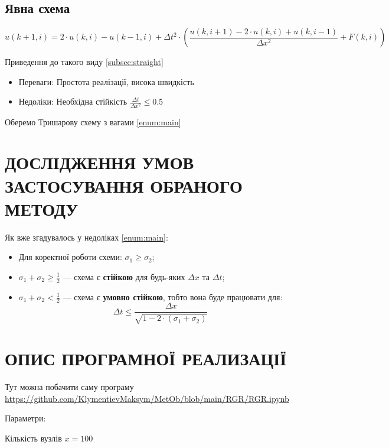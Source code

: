 \documentclass{article}
\begin{document}
        \subsection{Явна схема}
            \label{enum:straight}
            $$ u(k+1, i) = 2 \cdot u(k, i) - u(k-1, i) + \Delta{t}^2 \cdot \left( \frac{u(k, i+1) - 2 \cdot u(k, i) + u(k, i-1)}{\Delta{x}^2} + F(k, i) \right) $$

            Приведення до такого виду \eqref{subsec:straight}

            \begin{itemize}
                \item Переваги: Простота реалізації, висока швидкість
                \item Недоліки\label{itemz:straight}: Необхідна стійкість $ \frac{\Delta{t}}{\Delta{x}^2} \leq 0.5 $
            \end{itemize}

        Оберемо Тришарову схему з вагами \eqref{enum:main}

    \newpage
    \section{ДОСЛІДЖЕННЯ УМОВ ЗАСТОСУВАННЯ ОБРАНОГО МЕТОДУ}

    Як вже згадувалось у недоліках \eqref{enum:main}:

    \begin{itemize}
        \item Для коректної роботи схеми: $ \sigma_1 \geq \sigma_2 $;
        \item $ \sigma_1 + \sigma_2 \geq \frac{1}{2} $ --- схема є \textbf{стійкою} для будь-яких $ \Delta{x} $ та $ \Delta{t} $;
        \item $ \sigma_1 + \sigma_2 < \frac{1}{2} $ --- схема є \textbf{умовно стійкою}, тобто вона буде працювати для:
        $$ \Delta{t} \leq \frac{\Delta{x}}{\sqrt{1 - 2 \cdot(\sigma_1 + \sigma_2)}} $$
    \end{itemize}

    \newpage
    \section{ОПИС ПРОГРАМНОЇ РЕАЛИЗАЦІЇ}
        Тут можна побачити саму програму \url{https://github.com/KlymentievMaksym/MetOb/blob/main/RGR/RGR.ipynb}

        Параметри:

        Кількість вузлів $ x = 100 $
        
\end{document}
